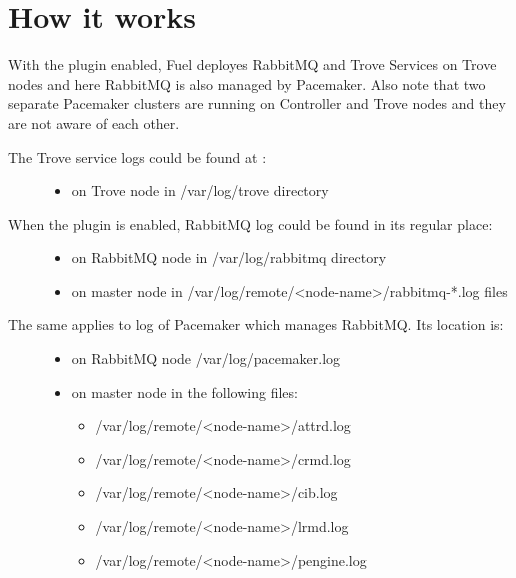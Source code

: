 \documentclass[letterpaper,10pt,english]{sphinxmanual}
\begin{document}
\section{How it works}
\label{user_guide:how-it-works}
With the plugin enabled, Fuel deployes RabbitMQ and Trove Services on Trove
nodes and here RabbitMQ is also managed by Pacemaker. Also note that two
separate Pacemaker clusters are running on Controller and Trove nodes and
they are not aware of each other.
\begin{description}
\item[{The Trove service logs could be found at :}] \leavevmode\begin{itemize}
\item {} 
on Trove node in /var/log/trove directory

\end{itemize}

\item[{When the plugin is enabled, RabbitMQ log could be found in its regular place:}] \leavevmode\begin{itemize}
\item {} 
on RabbitMQ node in /var/log/rabbitmq directory

\item {} 
on master node in /var/log/remote/\textless{}node-name\textgreater{}/rabbitmq-*.log files

\end{itemize}

\item[{The same applies to log of Pacemaker which manages RabbitMQ. Its location is:}] \leavevmode\begin{itemize}
\item {} 
on RabbitMQ node /var/log/pacemaker.log

\item {} 
on master node in the following files:
\begin{itemize}
\item {} 
/var/log/remote/\textless{}node-name\textgreater{}/attrd.log

\item {} 
/var/log/remote/\textless{}node-name\textgreater{}/crmd.log

\item {} 
/var/log/remote/\textless{}node-name\textgreater{}/cib.log

\item {} 
/var/log/remote/\textless{}node-name\textgreater{}/lrmd.log

\item {} 
/var/log/remote/\textless{}node-name\textgreater{}/pengine.log

\end{itemize}

\end{itemize}

\end{description}
\end{document}
